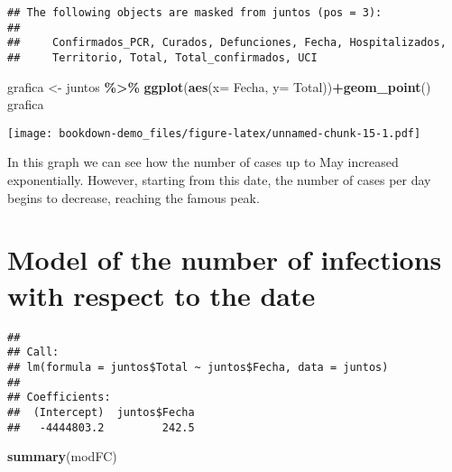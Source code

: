 \documentclass[
]{book}
\newenvironment{Shaded}{\begin{snugshade}}{\end{snugshade}}
\newcommand{\DataTypeTok}[1]{\textcolor[rgb]{0.13,0.29,0.53}{#1}}
\newcommand{\KeywordTok}[1]{\textcolor[rgb]{0.13,0.29,0.53}{\textbf{#1}}}
\newcommand{\NormalTok}[1]{#1}
\newcommand{\OperatorTok}[1]{\textcolor[rgb]{0.81,0.36,0.00}{\textbf{#1}}}
\newcommand{\StringTok}[1]{\textcolor[rgb]{0.31,0.60,0.02}{#1}}
\begin{document}
\begin{verbatim}
## The following objects are masked from juntos (pos = 3):
## 
##     Confirmados_PCR, Curados, Defunciones, Fecha, Hospitalizados,
##     Territorio, Total, Total_confirmados, UCI
\end{verbatim}

\begin{Shaded}
\begin{Highlighting}[]
\NormalTok{grafica \textless{}{-}}\StringTok{ }\NormalTok{juntos }\OperatorTok{\%\textgreater{}\%}\StringTok{ }\KeywordTok{ggplot}\NormalTok{(}\KeywordTok{aes}\NormalTok{(}\DataTypeTok{x=}\NormalTok{ Fecha, }\DataTypeTok{y=}\NormalTok{ Total))}\OperatorTok{+}\KeywordTok{geom\_point}\NormalTok{()}
\NormalTok{grafica}
\end{Highlighting}
\end{Shaded}

\texttt{[image: bookdown-demo\_files/figure-latex/unnamed-chunk-15-1.pdf]}

In this graph we can see how the number of cases up to May increased exponentially. However, starting from this date, the number of cases per day begins to decrease, reaching the famous peak.

\hypertarget{model-of-the-number-of-infections-with-respect-to-the-date}{%
\section{Model of the number of infections with respect to the date}\label{model-of-the-number-of-infections-with-respect-to-the-date}}

\begin{Shaded}
\end{Shaded}

\begin{verbatim}
## 
## Call:
## lm(formula = juntos$Total ~ juntos$Fecha, data = juntos)
## 
## Coefficients:
##  (Intercept)  juntos$Fecha  
##   -4444803.2         242.5
\end{verbatim}

\begin{Shaded}
\begin{Highlighting}[]
\KeywordTok{summary}\NormalTok{(modFC)}
\end{Highlighting}
\end{Shaded}
\end{document}
